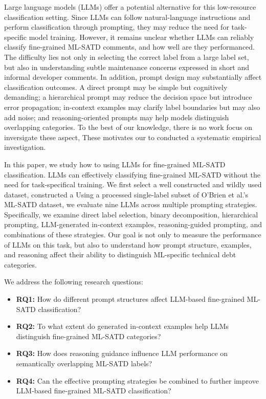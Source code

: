 \documentclass[acmsmall,screen,review,anonymous]{acmart}
\begin{document}
Large language models (LLMs) offer a potential alternative for this low-resource classification setting. Since LLMs can follow natural-language instructions and perform classification through prompting, they may reduce the need for task-specific model training. However, it remains unclear whether LLMs can reliably classify fine-grained ML-SATD comments, and how well are they performanced. The difficulty lies not only in selecting the correct label from a large label set, but also in understanding subtle maintenance concerns expressed in short and informal developer comments. In addition, prompt design may substantially affect classification outcomes. A direct prompt may be simple but cognitively demanding; a hierarchical prompt may reduce the decision space but introduce error propagation; in-context examples may clarify label boundaries but may also add noise; and reasoning-oriented prompts may help models distinguish overlapping categories. To the best of our knowledge, there is no work focus on inversigate these aspect, These motivates our to conducted a systematic empirical investigation.

In this paper, we study how to using LLMs for fine-grained ML-SATD classification. LLMs can effectively classifying fine-grained ML-SATD without the need for task-specifical training. We first select a well constructed and wildly used dataset, \citet{obrien202223} constructed a Using a processed single-label subset of O'Brien et al.'s ML-SATD dataset, we evaluate nine LLMs across multiple prompting strategies. Specifically, we examine direct label selection, binary decomposition, hierarchical prompting, LLM-generated in-context examples, reasoning-guided prompting, and combinations of these strategies. Our goal is not only to measure the performance of LLMs on this task, but also to understand how prompt structure, examples, and reasoning affect their ability to distinguish ML-specific technical debt categories.

We address the following research questions:

\begin{itemize}
    \item \textbf{RQ1:} How do different prompt structures affect LLM-based fine-grained ML-SATD classification?
    \item \textbf{RQ2:} To what extent do generated in-context examples help LLMs distinguish fine-grained ML-SATD categories?
    \item \textbf{RQ3:} How does reasoning guidance influence LLM performance on semantically overlapping ML-SATD labels?
    \item \textbf{RQ4:} Can the effective prompting strategies be combined to further improve LLM-based fine-grained ML-SATD classification?
\end{itemize}
\end{document}
